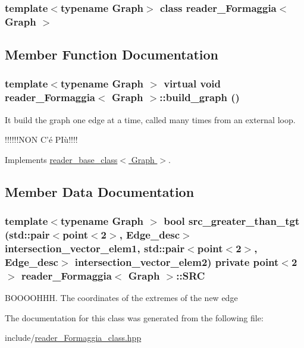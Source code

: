 \subsubsection*{template$<$typename Graph$>$ class reader\_\-Formaggia$<$ Graph $>$}



\subsection{Member Function Documentation}
\hypertarget{classreader__Formaggia_a491d681e3a8c1bfd5f11e1a257235bd7}{
\subsubsection[{build\_\-graph}]{\setlength{\rightskip}{0pt plus 5cm}template$<$typename Graph $>$ virtual void {\bf reader\_\-Formaggia}$<$ Graph $>$::build\_\-graph ()}}
\label{classreader__Formaggia_a491d681e3a8c1bfd5f11e1a257235bd7}


It build the graph one edge at a time, called many times from an external loop. 

!!!!!!NON C'é PIù!!!! 

Implements \hyperlink{classreader__base__class_a536131b6cc6f007b87735626c29650c6}{reader\_\-base\_\-class$<$ Graph $>$}.

\subsection{Member Data Documentation}
\hypertarget{classreader__Formaggia_a890594cb9412b19c8a6131c62e60ff0a}{
\subsubsection[{SRC}]{\setlength{\rightskip}{0pt plus 5cm}template$<$typename Graph $>$ bool src\_\-greater\_\-than\_\-tgt (std::pair$<${\bf point}$<$2$>$, Edge\_\-desc$>$ intersection\_\-vector\_\-elem1, std::pair$<${\bf point}$<$2$>$, Edge\_\-desc$>$ intersection\_\-vector\_\-elem2) private {\bf point}$<$2$>$ {\bf reader\_\-Formaggia}$<$ Graph $>$::{\bf SRC}}}
\label{classreader__Formaggia_a890594cb9412b19c8a6131c62e60ff0a}


BOOOOHHH. The coordinates of the extremes of the new edge 

The documentation for this class was generated from the following file:\begin{DoxyCompactItemize}
\item 
include/\hyperlink{reader__Formaggia__class_8hpp}{reader\_\-Formaggia\_\-class.hpp}\end{DoxyCompactItemize}
